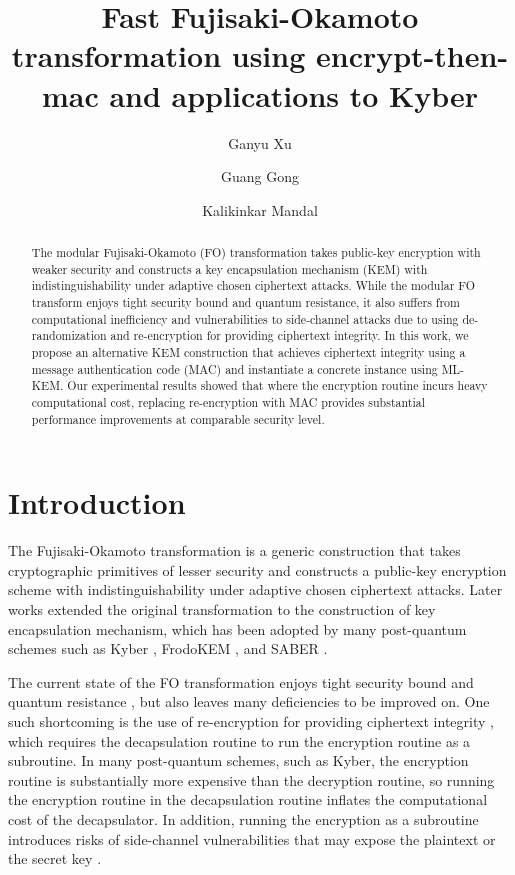 \documentclass[floatrow,journal=tches,submission]{iacrtrans}
\author{
    Ganyu Xu\inst{1}
    \and Guang Gong\inst{1}
    \and Kalikinkar Mandal\inst{2}
}
\institute{
  University of Waterloo, Waterloo, Canada, \email{{g66xu,ggong}@uwaterloo.ca}
  \and
  University of New Brunswick, New Brunswick, Canada, \email{kmandal@unb.ca}
}
\title[IND-CCA2 secure KEM using encrypt-then-MAC]{
Fast Fujisaki-Okamoto transformation  using encrypt-then-mac and applications to Kyber}
\begin{document}
\maketitle




\begin{abstract}
  The modular Fujisaki-Okamoto (FO) transformation takes public-key encryption with weaker security and constructs a key encapsulation mechanism (KEM) with indistinguishability under adaptive chosen ciphertext attacks. While the modular FO transform enjoys tight security bound and quantum resistance, it also suffers from computational inefficiency and vulnerabilities to side-channel attacks due to using de-randomization and re-encryption for providing ciphertext integrity. In this work, we propose an alternative KEM construction that achieves ciphertext integrity using a message authentication code (MAC) and instantiate a concrete instance using ML-KEM. Our experimental results showed that where the encryption routine incurs heavy computational cost, replacing re-encryption with MAC provides substantial performance improvements at comparable security level.
\end{abstract}


\section{Introduction}
The Fujisaki-Okamoto transformation \cite{fujisaki1999secure} is a generic construction that takes cryptographic primitives of lesser security and constructs a public-key encryption scheme with indistinguishability under adaptive chosen ciphertext attacks. Later works \cite{hofheinz2017modular} extended the original transformation to the construction of key encapsulation mechanism, which has been adopted by many post-quantum schemes such as Kyber \cite{bos2018crystals}, FrodoKEM \cite{bos2016frodo}, and SABER \cite{d2018saber}.

The current state of the FO transformation enjoys tight security bound and quantum resistance \cite{hofheinz2017modular}, but also leaves many deficiencies to be improved on. One such shortcoming is the use of re-encryption for providing ciphertext integrity \cite{bernstein2018towards}, which requires the decapsulation routine to run the encryption routine as a subroutine. In many post-quantum schemes, such as Kyber, the encryption routine is substantially more expensive than the decryption routine, so running the encryption routine in the decapsulation routine inflates the computational cost of the decapsulator. In addition, running the encryption as a subroutine introduces risks of side-channel vulnerabilities that may expose the plaintext or the secret key \cite{ravi2019generic}\cite{ueno2022curse}.
\end{document}
